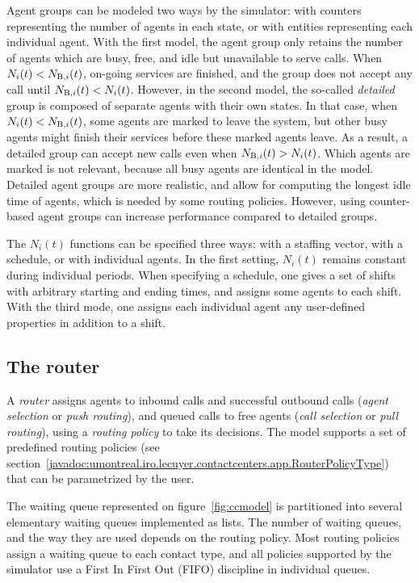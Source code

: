 Agent groups can be modeled two ways by the simulator: with counters
representing the number of agents in each state, or with entities
representing each individual agent.
With the first model, the agent group only retains the number of
agents which are busy, free, and idle but unavailable to serve calls.
When $N_i(t)<\Nb[i](t)$, on-going services
are finished, and the group does not accept any call until
$\Nb[i](t) < N_i(t)$.
However, in the second model, the so-called \emph{detailed} group is
composed of
separate agents with their own states.
In that case, when $N_i(t)<\Nb[i](t)$,
some agents are marked to leave the system, but other busy agents
might finish their services before these marked agents leave.
As a
result, a detailed group can accept new calls even when
$\Nb[i](t)>N_i(t)$.
Which agents are marked is not relevant, because all busy agents are
identical in the model.
Detailed agent groups are more realistic, and allow for computing the
longest idle time of agents, which is needed by some routing
policies. However, using counter-based agent groups can increase
performance compared to detailed groups.

The $N_i(t)$ functions can be specified three ways: with a staffing
vector, with a schedule, or with individual agents.
In the first setting, $N_i(t)$ remains constant during individual
periods.
When specifying a schedule, one gives a set of shifts with arbitrary
starting and ending times, and assigns some agents to each shift.
With the third mode, one assigns each individual agent
any user-defined properties in addition to a shift.

\subsection{The router}
\label{sec:routergeninfo}

A \emph{router} assigns agents to inbound calls and successful
outbound calls (\emph{agent selection} or
\emph{push routing}), and
queued calls to free agents (\emph{call selection} or
\emph{pull routing}), using
a \emph{routing policy} to take its decisions.
The model supports a set of predefined routing policies (see
section~\ref{javadoc:umontreal.iro.lecuyer.contactcenters.app.RouterPolicyType})
that can be parametrized by the user.

The waiting queue
represented on figure~\ref{fig:ccmodel}
is partitioned into several
elementary waiting queues implemented as lists.
The number of waiting queues,
and the way they are used
depends on the routing policy.  Most routing policies assign a
waiting queue to each contact type, and all policies supported by the
simulator use a First In First Out (FIFO) discipline in individual
queues.

